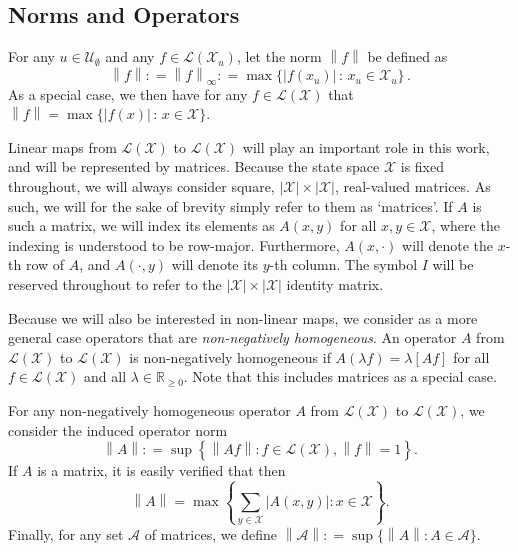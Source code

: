 \documentclass[10pt,a4paper]{paper}
\theoremstyle{definition}
\newcommand{\reals}{\mathbb{R}}
\newcommand{\realsnonneg}{\reals_{\geq 0}}
\newcommand{\states}{\mathcal{X}}
\newcommand{\gambles}{\mathcal{L}}
\newcommand{\gamblesX}{\gambles(\states)}
\newcommand{\norm}[1]{\left\lVert #1 \right\rVert}
\newcommand{\abs}[1]{\left\vert #1 \right\vert}
\newcommand{\coloneqq}{:\!=}
\begin{document}

\subsection{Norms and Operators}\label{sec:func_oper_norm}

For any $u\in\mathcal{U}_\emptyset$ and any $f\in\gambles(\states_u)$, let the norm $\norm{f}$ be defined as
\begin{equation*}
\norm{f} \coloneqq \norm{f}_{\infty} \coloneqq \max\{\abs{f(x_u)}\,:\,x_u\in\states_u\}\,.
\end{equation*}
As a special case, we then have for any $f\in\gamblesX$ that $\norm{f}=\max\{\abs{f(x)}\,:\,x\in\states\}$.

Linear maps from $\gamblesX$ to $\gamblesX$ will play an important role in this work, and will be represented by matrices. Because the state space $\states$ is fixed throughout, we will always consider square, $\abs{\states}\times\abs{\states}$, real-valued matrices.
As such, we will for the sake of brevity simply refer to them as `matrices'. If $A$ is such a matrix, we will index its elements as $A(x,y)$ for all $x,y\in\states$, where the indexing is understood to be row-major. Furthermore, $A(x,\cdot)$ will denote the $x$-th row of $A$, and $A(\cdot,y)$ will denote its $y$-th column. The symbol $I$ will be reserved throughout to refer to the $\abs{\states}\times\abs{\states}$ identity matrix.

Because we will also be interested in non-linear maps, we consider as a more general case operators that are \emph{non-negatively homogeneous}. An operator $A$ from $\gamblesX$ to $\gamblesX$ is non-negatively homogeneous if $A(\lambda f)=\lambda \left[Af\right]$ for all $f\in\gamblesX$ and all $\lambda\in\realsnonneg$. Note that this includes matrices as a special case.

For any non-negatively homogeneous operator $A$ from $\gamblesX$ to $\gamblesX$, we consider the induced operator norm
\begin{equation}\label{eq:operatornorm}
\norm{A}\coloneqq\sup\left\{\norm{Af}\colon f\in\gamblesX,\norm{f}=1\right\}.
\end{equation}
If $A$ is a matrix, it is easily verified that then
\begin{equation}\label{eq:normofmatrix}
\norm{A}
=
\max\left\{\sum_{y\in\states}\abs{A(x,y)}\colon x\in\states\right\}.
\end{equation}
\noindent
Finally, for any set $\mathcal{A}$ of matrices, we define $\norm{\mathcal{A}}\coloneqq\sup\{\norm{A}\colon A\in\mathcal{A}\}$.
\end{document}
